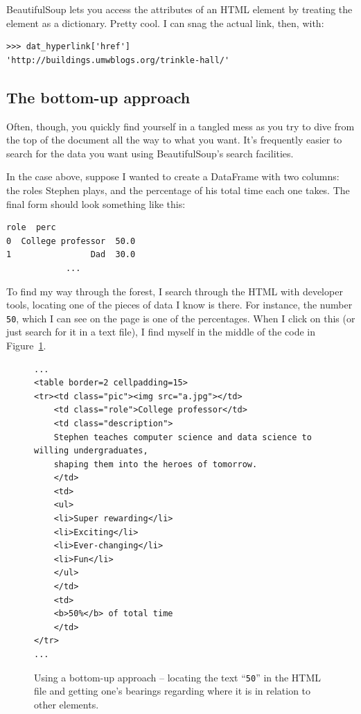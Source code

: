BeautifulSoup lets you access the attributes of an HTML element by treating
the element as a dictionary. Pretty cool. I can snag the actual link, then,
with:

\begin{Verbatim}[fontsize=\footnotesize,samepage=true,frame=single]
>>> dat_hyperlink['href']
'http://buildings.umwblogs.org/trinkle-hall/'
\end{Verbatim}

\subsection{The bottom-up approach}

Often, though, you quickly find yourself in a tangled mess as you try to dive
from the top of the document all the way to what you want. It's frequently
easier to search for the data you want using BeautifulSoup's search
facilities.

In the case above, suppose I wanted to create a DataFrame with two columns:
the roles Stephen plays, and the percentage of his total time each one takes.
The final form should look something like this:

\begin{Verbatim}[fontsize=\small,samepage=true,frame=none]
                role  perc
0  College professor  50.0
1                Dad  30.0
            ...
\end{Verbatim}


To find my way through the forest, I search through the HTML with developer
tools, locating one of the pieces of data I know is there. For instance, the
number \texttt{50}, which I can see on the page is one of the percentages.
When I click on this (or just search for it in a text file), I find myself in
the middle of the code in Figure~\ref{fig:bottomUpSearch}.

\begin{figure}[ht]
\centering
\begin{Verbatim}[fontsize=\footnotesize,samepage=true,frame=lines]
...
<table border=2 cellpadding=15>
<tr><td class="pic"><img src="a.jpg"></td>
    <td class="role">College professor</td>
    <td class="description">
    Stephen teaches computer science and data science to willing undergraduates,
    shaping them into the heroes of tomorrow.
    </td>
    <td>
    <ul>
    <li>Super rewarding</li>
    <li>Exciting</li>
    <li>Ever-changing</li>
    <li>Fun</li>
    </ul>
    </td>
    <td>
    <b>50%</b> of total time
    </td>
</tr>
...
\end{Verbatim}
\caption{Using a bottom-up approach -- locating the text ``\texttt{50}'' in
the HTML file and getting one's bearings regarding where it is in relation to
other elements.}
\label{fig:bottomUpSearch}
\end{figure}
\normalsize

